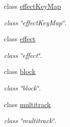 \begin{DoxyCompactItemize}
class \hyperlink{classlives_1_1effectKeyMap}{effect\-Key\-Map}
\begin{DoxyCompactList}\small\item\em class \char`\"{}effect\-Key\-Map\char`\"{}. \end{DoxyCompactList}\item 
class \hyperlink{classlives_1_1effect}{effect}
\begin{DoxyCompactList}\small\item\em class \char`\"{}effect\char`\"{}. \end{DoxyCompactList}\item 
class \hyperlink{classlives_1_1block}{block}
\begin{DoxyCompactList}\small\item\em class \char`\"{}block\char`\"{}. \end{DoxyCompactList}\item 
class \hyperlink{classlives_1_1multitrack}{multitrack}
\begin{DoxyCompactList}\small\item\em class \char`\"{}multitrack\char`\"{}. \end{DoxyCompactList}\end{DoxyCompactItemize}
